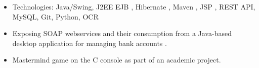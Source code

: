 \documentclass[10pt,a4paper]{altacv}
\begin{document}
 {}
\begin{itemize}
	\item Technologies: Java/Swing, J2EE EJB , Hibernate , Maven , JSP , REST API, MySQL, Git, Python, OCR 
\end{itemize}
 {}
\begin{itemize}
	\item Exposing SOAP webservices and their consumption from a Java-based desktop application for managing bank accounts . 
\end{itemize}
 {}
\begin{itemize}
	\item Mastermind game on the C console as part of an academic project. 
\end{itemize}
\end{document}
